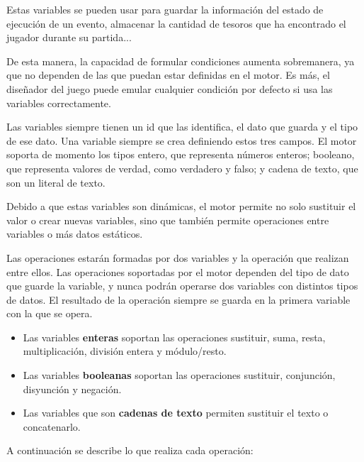 Estas variables se pueden usar para guardar la información del estado de ejecución de un evento, almacenar la cantidad de tesoros que ha encontrado el jugador durante su partida...

De esta manera, la capacidad de formular condiciones aumenta sobremanera, ya que no dependen de las que puedan estar definidas en el motor. Es más, el diseñador del juego puede emular cualquier condición por defecto si usa las variables correctamente.

Las variables siempre tienen un id que las identifica, el dato que guarda y el tipo de ese dato. Una variable siempre se crea definiendo estos tres campos.
El motor soporta de momento los tipos entero, que representa números enteros; booleano, que representa valores de verdad, como verdadero y falso; y cadena de texto, que son un literal de texto.

Debido a que estas variables son dinámicas, el motor permite no solo sustituir el valor o crear nuevas variables, sino que también permite operaciones entre variables o más datos estáticos.

Las operaciones estarán formadas por dos variables y la operación que realizan entre ellos. Las operaciones soportadas por el motor dependen del tipo de dato que guarde la variable, y nunca podrán operarse dos variables con distintos tipos de datos. El resultado de la operación siempre se guarda en la primera variable con la que se opera.

\begin{itemize}
	\item Las variables \textbf{enteras} soportan las operaciones sustituir, suma, resta, multiplicación, división entera y módulo/resto.
	\item Las variables \textbf{booleanas} soportan las operaciones sustituir, conjunción, disyunción y negación.
	\item Las variables que son \textbf{cadenas de texto} permiten sustituir el texto o concatenarlo.
\end{itemize}

A continuación se describe lo que realiza cada operación:


